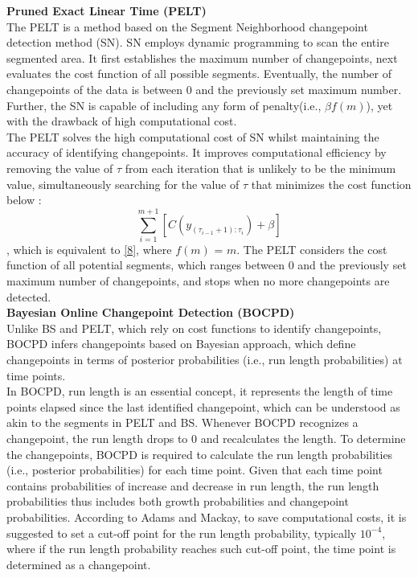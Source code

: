 \documentclass[]{interact}
\theoremstyle{plain}%
\theoremstyle{definition}
\theoremstyle{remark}
\begin{document}
{	\hspace{-0.55cm} \textbf{Pruned Exact Linear Time (PELT)}\\
	
	The PELT is a method based on the Segment Neighborhood changepoint detection method (SN)\cite{augerAlgorithmsOptimalIdentification1989}. SN employs dynamic programming to scan the entire segmented area. It first establishes the maximum number of changepoints, next evaluates the cost function of all possible segments. Eventually, the number of changepoints of the data is between 0 and the previously set maximum number. Further, the SN is capable of including any form of penalty(i.e., $\beta f(m)$), yet with the drawback of high computational cost. \\
	
	The PELT solves the high computational cost of SN whilst maintaining the accuracy of identifying changepoints. It improves computational efficiency by removing the value of $\tau$ from each iteration that is unlikely to be the minimum value, simultaneously searching for the value of $\tau$ that minimizes the cost function below \cite{killickOptimalDetectionChangepoints2012}:
	\begin{equation} \label{10}
		\sum_{i = 1} ^{m + 1} \left[C(y_{({\tau_{i-1} + 1}):\tau_{i}}) + \beta \right]
	\end{equation}
	, which is equivalent to \eqref{8}, where $f(m)$ = $m$. The PELT considers the cost function of all potential segments, which ranges between 0 and the previously set maximum number of changepoints, and stops when no more changepoints are detected.\\
	
	\hspace{-0.55cm} \textbf{Bayesian Online Changepoint Detection (BOCPD)}\\
	
	Unlike BS and PELT, which rely on cost functions to identify changepoints, BOCPD infers changepoints based on Bayesian approach, which define changepoints in terms of posterior probabilities (i.e., run length probabilities) at time points. \\
	
	In BOCPD, run length is an essential concept, it represents the length of time points elapsed since the last identified changepoint, which can be understood as akin to the segments in PELT and BS. Whenever BOCPD recognizes a changepoint, the run length drops to 0 and recalculates the length. To determine the changepoints, BOCPD is required to calculate the run length probabilities (i.e., posterior probabilities) for each time point. Given that each time point contains probabilities of increase and decrease in run length, the run length probabilities thus includes both growth probabilities and changepoint probabilities. According to Adams and Mackay\cite{adamsBayesianOnlineChangepoint2007}, to save computational costs, it is suggested to set a cut-off point for the run length probability, typically $10^{-4}$, where if the run length probability reaches such cut-off point, the time point is determined as a changepoint. \\
	
}
\end{document}
